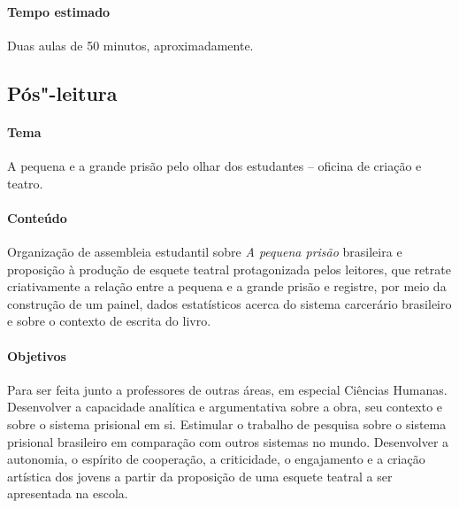 \documentclass[11pt]{extarticle}
\begin{document}
\paragraph{Tempo estimado} Duas aulas de 50 minutos, aproximadamente.


\subsection{Pós"-leitura}

\paragraph{Tema} A pequena e a grande prisão pelo olhar dos estudantes
-- oficina de criação e teatro.

\paragraph{Conteúdo} Organização de assembleia estudantil sobre \emph{A
pequena prisão} brasileira e proposição à produção de esquete teatral
protagonizada pelos leitores, que retrate criativamente a relação entre
a pequena e a grande prisão e registre, por meio da construção de um
painel, dados estatísticos acerca do sistema carcerário brasileiro e
sobre o contexto de escrita do livro.

\paragraph{Objetivos} Para ser feita junto a professores de outras áreas, em especial Ciências Humanas. Desenvolver a capacidade analítica e argumentativa
sobre a obra, seu contexto e sobre o sistema prisional em si. Estimular
o trabalho de pesquisa sobre o sistema prisional brasileiro em
comparação com outros sistemas no mundo. Desenvolver a autonomia, o
espírito de cooperação, a criticidade, o engajamento e a criação
artística dos jovens a partir da proposição de uma esquete teatral a ser
apresentada na escola.
\end{document}
